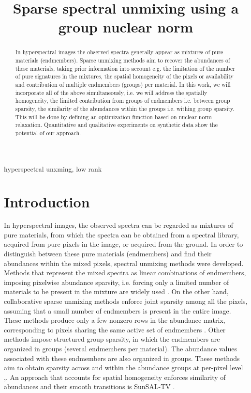 \documentclass{article}
\title{Sparse spectral unmixing using a group nuclear norm}
\begin{document}
%
\maketitle
%
\begin{abstract}
In hyperspectral images the observed spectra generally appear as mixtures of %
pure materials (endmembers). Sparse unmixing methods aim to recover the abundances of these materials, taking prior information into account e.g. the limitation of the number of pure signatures in the mixtures, the spatial homogeneity of the pixels or availability and contribution of multiple endmembers (groups) per material. In this work, we will incorporate all of the above simultaneously, i.e. we will address the spatially homogeneity, the limited contribution from groups of endmembers i.e. between group sparsity, the similarity of the abundances within the groups i.e. withing group sparsity. This will be done by defining an optimization function based on nuclear norm relaxation. Quantitative and qualitative experiments on synthetic data show the potential of our approach.    
\end{abstract}
%
\begin{keywords}
hyperspectral unxming, low rank 
\end{keywords}
%
\section{Introduction}
In hyperspectral images, the observed spectra can be regarded as mixtures of pure materials, from which the spectra can be obtained from a spectral library,   acquired from pure pixels in the image, or acquired from the ground. In order to distinguish between these pure materials (endmembers) and find their abundances  within the mixed pixels, spectral unmixing methods were developed. Methods that represent the mixed spectra as linear combinations of endmembers, imposing pixelwise abundance sparsity, i.e. forcing only a limited number of materials to be present in the mixture are widely used \cite{spUnmix}. On the other hand,  collaborative sparse unmixing methods enforce joint sparsity among all the pixels, assuming that a small number of endmembers is present in the entire image. These methods produce only a few nonzero rows in the abundance matrix, corresponding to pixels sharing the same active set of endmembers \cite{iordache14}.
Other methods impose structured group sparsity, in which the endmembers %
are organized in groups (several endmembers per material). The abundance values associated with these endmembers are also organized in groups. These methods aim to obtain sparsity across and within the abundance groups at per-pixel level \cite{spGroup_unmix},\cite{socialSparsity}. An approach that accounts for  spatial homogeneity enforces similarity of abundances
and their smooth transitions is SunSAL-TV \cite{totVar}.
\end{document}
